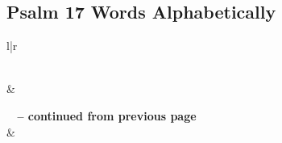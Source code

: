 

\subsection{Psalm 17 Words Alphabetically}


\normalsize
 
\begin{center}
\begin{longtable}{l|r}
\caption[Psalm 17 Words Alphabetically]{Psalm 17 Words Alphabetically}\label{table:WordsAlphabetically for Psalm 17} \\
\hline {} &  \\ \hline 
\endfirsthead
 
{{\bfseries \tablename\ \thetable{} -- continued from previous page}} \\  
\hline {} &  \\ \hline 
\endhead
 

\end{longtable}
\end{center}
